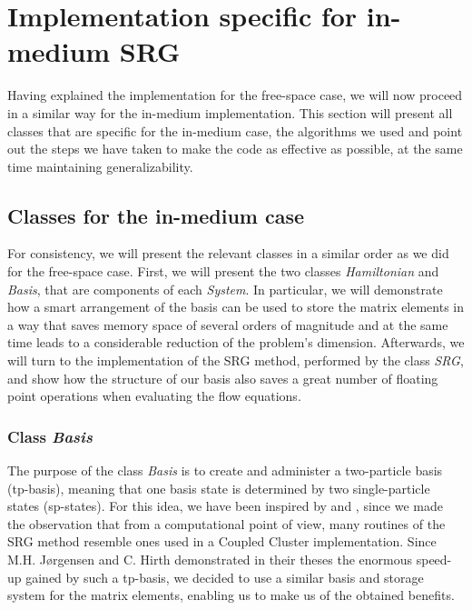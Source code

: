 \section{Implementation specific for in-medium SRG}
\label{sec:ImplIMSRG}

Having explained the implementation for the free-space case, we will now proceed in a similar way for the in-medium implementation. This section will present all classes that are specific for the in-medium case, the algorithms we used and point out the steps we have taken to make the code as effective as possible, at the same time maintaining generalizability. 

\subsection{Classes for the in-medium case}

For consistency, we will present the relevant
classes  in a similar order as we did for the free-space case. First, we will present the two classes \textit{Hamiltonian} and \textit{Basis}, that are components of each \textit{System}. In particular, we will demonstrate how a smart arrangement of the basis can be used to store the matrix elements in a way that saves memory space of several orders of magnitude and at the same time 
leads to a considerable reduction of the problem's
dimension. Afterwards, we will turn to the implementation of the SRG method, performed by the class \textit{SRG}, and show how the structure of our basis also saves a great number of floating point operations when evaluating the flow equations.

\subsubsection{Class \textit{Basis}}

The purpose of the class \textit{Basis} is to create and administer a two-particle basis (tp-basis), meaning that one basis state is determined by two single-particle states (sp-states). For this idea, we have been inspired by \cite{Marte} and \cite{Christoffer}, since we made the observation that from a computational point of view, many routines of the SRG method resemble ones used in a Coupled Cluster implementation. Since M.H. J\o rgensen and C. Hirth demonstrated in their theses the enormous speed-up gained by such a  tp-basis, we decided to use a similar basis and storage system for the matrix elements, enabling us to make us of the obtained benefits.

